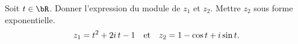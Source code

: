 
\begin{exercice}  \;
Soit $t \in \bR$. Donner l'expression du module de $z_1$ et $z_2$. Mettre $z_2$ sous forme exponentielle.
$$z_1=t^2+2i \, t-1\quad\hbox{et}\quad z_2=1-\cos{t}+i\sin{t}.$$
\end{exercice}